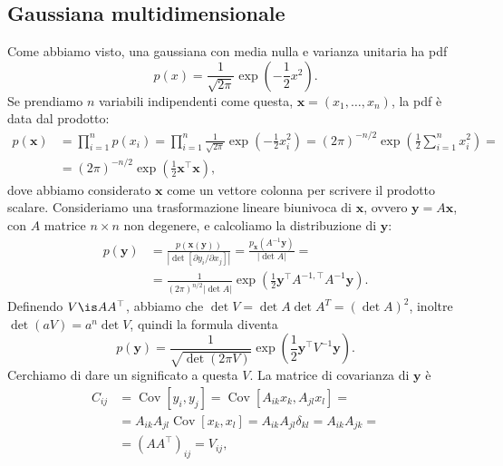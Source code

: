 
\subsection{Gaussiana multidimensionale}

Come abbiamo visto, una gaussiana con media nulla e varianza unitaria ha pdf
%
\begin{equation*}
    p(x) = \frac1{\sqrt{2\pi}}\exp\left(-\frac12 x^2\right).
\end{equation*}
%
Se prendiamo $n$ variabili indipendenti come questa, $\mathbf x = (x_1, \ldots,
x_n)$, la pdf è data dal prodotto:
%
\begin{align*}
    p(\mathbf x) &= \prod_{i=1}^n p(x_i)
    = \prod_{i=1}^n \frac1{\sqrt{2\pi}}\exp\left(-\frac12 x_i^2\right)
    = (2\pi)^{-n/2} \exp\left(\frac12 \sum_{i=1}^n x_i^2 \right) = \\
    &= (2\pi)^{-n/2} \exp\left(\frac12 \mathbf x^\top \mathbf x\right),
\end{align*}
%
dove abbiamo considerato $\mathbf x$ come un vettore colonna per scrivere il
prodotto scalare. Consideriamo una trasformazione lineare biunivoca di $\mathbf
x$, ovvero $\mathbf y = A\mathbf x$, con $A$ matrice $n\times n$ non degenere,
e calcoliamo la distribuzione di $\mathbf y$:
%
\begin{align*}
    p(\mathbf y) &= \frac{p(\mathbf x(\mathbf y))}
    {|\det [\partial y_i/\partial x_j]|}
    = \frac{p_{\mathbf x}(A^{-1}\mathbf y)}{|\det A|} = \\
    &= \frac1{(2\pi)^{n/2}|\det A|}
    \exp\left(\frac12 \mathbf y^\top A^{-1,\top} A^{-1} \mathbf y\right).
\end{align*}
%
Definendo $V \is AA^\top$, abbiamo che $\det V = \det A\det A^T = (\det A)^2$,
inoltre $\det(aV) = a^n\det V$, quindi la formula diventa
%
\begin{equation*}
    p(\mathbf y) = \frac1{\sqrt{\det(2\pi V)}}
    \exp\left(\frac12 \mathbf y^\top V^{-1} \mathbf y\right).
\end{equation*}
%
Cerchiamo di dare un significato a questa $V$. La matrice di covarianza di
$\mathbf y$ è
%
\begin{align*}
    C_{ij} &= \operatorname{Cov}[y_i, y_j]
    = \operatorname{Cov}[A_{ik} x_k, A_{jl} x_l] = \\
    &= A_{ik} A_{jl} \operatorname{Cov}[x_k, x_l]
    = A_{ik} A_{jl} \delta_{kl}
    = A_{ik} A_{jk} = \\
    &= (AA^\top)_{ij} = V_{ij},
\end{align*}
